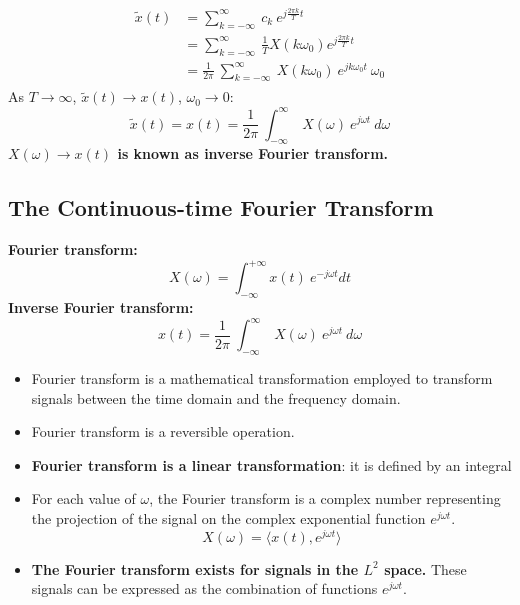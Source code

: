 \begin{ex}{}
    \begin{align*}
    \begin{split}
        \tilde{x}(t) &=\sum_{k=-\infty}^{\infty} \ c_{k} \ e^{j\frac{2\pi k}{T}t}\\
        &= \sum_{k=-\infty}^{\infty}  \ \frac{1}{T} X(k\omega_{0}) e^{j\frac{2\pi k}{T}t}\\
        &= \frac{1}{2 \pi} \ \sum_{k=-\infty}^{\infty} \ X(k \omega_{0}) \ e^{j k \omega_{0} t} \ \omega_{0} 
    \end{split}
    \end{align*}
    As $T \to \infty$, $\tilde{x}(t) \to x(t)$, $\omega_{0} \to 0$:
    \begin{equation}
        \tilde{x}(t) = x(t) = \frac{1}{2 \pi} \ \int_{-\infty}^{\infty} \ X( \omega) \ e^{j \omega t} \ d\omega 
    \end{equation}
    \textbf{$X(\omega) \to x(t)$ is known as inverse Fourier transform.}
\end{ex}

\subsection{The Continuous-time Fourier Transform}
\textbf{Fourier transform:}
\[ X(\omega) =  \int_{-\infty}^{+\infty} x(t) \ e^{-j \omega t} dt \]
\textbf{Inverse Fourier transform:}
\[ x(t) = \frac{1}{2 \pi} \ \int_{-\infty}^{\infty} \ X( \omega) \ e^{j \omega t} \ d\omega \]

\begin{itemize}
    \item Fourier transform is a mathematical transformation employed to transform signals between the time domain and the frequency domain.
    
    \item Fourier transform is a reversible operation.
    
    \item \textbf{Fourier transform is a linear transformation}: it is defined by an integral
    
    \item For each value of $\omega$, the Fourier transform is a complex number representing the projection of the signal on the complex exponential function $e^{j \omega t }$.
    \[ X(\omega) = \langle x(t), e^{j \omega t} \rangle \]
    
    \item \textbf{The Fourier transform exists for signals in the $L^{2}$ space.} These signals can be expressed as the combination of functions $e^{j \omega t}$.
\end{itemize}

